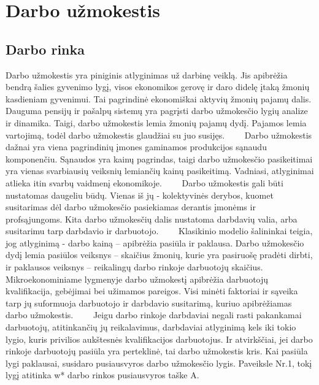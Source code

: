 \documentclass[12pt,a4paper]{article}
\theoremstyle{change}\newtheorem{salyga}{Uždavinys}
\begin{document}
\section{Darbo užmokestis}
\bigskip



\subsection{Darbo rinka}
\medskip
\hspace{40pt}Darbo užmokestis yra piniginis atlyginimas už darbinę veiklą. Jis apibrėžia bendrą šalies gyvenimo lygį, visos ekonomikos gerovę ir daro didelę įtaką žmonių kasdieniam gyvenimui. Tai pagrindinė ekonomiškai aktyvių žmonių pajamų dalis. Dauguma pensijų ir pašalpų sistemų yra pagrįsti darbo užmokesčio lygių analize ir dinamika. Taigi, darbo užmokestis lemia žmonių pajamų dydį. Pajamos lemia vartojimą, todėl darbo užmokestis glaudžiai su juo susijęs.
\vskip 8pt
$\qquad $Darbo užmokestis dažnai yra viena pagrindinių įmones gaminamos produkcijos sąnaudu komponenčiu. Sąnaudos yra kainų pagrindas, taigi darbo užmokesčio pasikeitimai yra vienas svarbiausių veiksnių lemiančių kainų pasikeitimą. Vadniasi, atlyginimai atlieka itin svarbų vaidmenį ekonomikoje.
\vskip 8pt
$\qquad $Darbo užmokestis gali būti nustatomas daugeliu būdų. Vienas iš jų - kolektyvinės derybos, kuomet susitarimas dėl darbo užmokesčio pasiekiamas derantis įmonėms ir profsąjungoms. Kita darbo užmokesčių dalis nustatoma darbdavių valia, arba susitarimu tarp darbdavio ir darbuotojo. 
\vskip 8pt
$\qquad $Klasikinio modelio šalininkai teigia, jog atlyginimą - darbo kainą – apibrėžia pasiūla ir paklausa. Darbo užmokesčio dydį lemia pasiūlos veiksnys – skaičius žmonių, kurie yra pasiruošę pradėti dirbti, ir paklausos veiksnys – reikalingų darbo rinkoje darbuotojų skaičius. Mikroekonominiame lygmenyje darbo užmokestį apibrėžia darbuotojų kvalifikacija, gebėjimai bei užimamos pareigos. Visi minėti faktoriai ir sąveika tarp jų suformuoja darbuotojo ir darbdavio susitarimą, kuriuo apibrėžiamas darbo užmokestis. 
\vskip 8pt
$\qquad $Jeigu darbo rinkoje darbdaviai negali rasti pakankamai darbuotojų, atitinkančių jų reikalavimus, darbdaviai atlyginimą kels iki tokio lygio, kuris privilios aukštesnės kvalifikacijos darbuotojus. Ir atvirkščiai, jei darbo rinkoje darbuotojų pasiūla yra perteklinė, tai darbo užmokestis kris. Kai pasiūla lygi paklausai, susidaro pusiausvyros darbo užmokesčio lygis. Paveiksle Nr.1, tokį lygį atitinka w* darbo rinkos pusiausvyros taške A. 
\vskip 8pt
\end{document}

